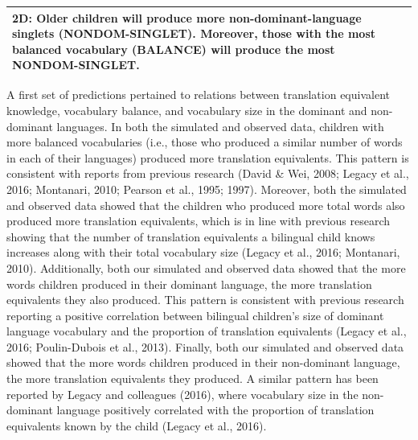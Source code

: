 \documentclass[
  english,
  ,man,floatsintext]{apa6}
\begin{document}
\begin{landscape}
\begin{table}
\begin{tabular}[t]{>{\raggedright\arraybackslash}p{200px}>{\raggedright\arraybackslash}p{250px}>{\centering\arraybackslash}p{150px}}
2D: Older children will produce more non-dominant-language singlets (NONDOM-SINGLET). Moreover, those with the most balanced vocabulary (BALANCE) will produce the most NONDOM-SINGLET. &  & \\
\bottomrule
\end{tabular}
\end{table}
\end{landscape}

A first set of predictions pertained to relations between translation equivalent knowledge, vocabulary balance, and vocabulary size in the dominant and non-dominant languages. In both the simulated and observed data, children with more balanced vocabularies (i.e., those who produced a similar number of words in each of their languages) produced more translation equivalents. This pattern is consistent with reports from previous research (David \& Wei, 2008; Legacy et al., 2016; Montanari, 2010; Pearson et al., 1995; 1997). Moreover, both the simulated and observed data showed that the children who produced more total words also produced more translation equivalents, which is in line with previous research showing that the number of translation equivalents a bilingual child knows increases along with their total vocabulary size (Legacy et al., 2016; Montanari, 2010). Additionally, both our simulated and observed data showed that the more words children produced in their dominant language, the more translation equivalents they also produced. This pattern is consistent with previous research reporting a positive correlation between bilingual children's size of dominant language vocabulary and the proportion of translation equivalents (Legacy et al., 2016; Poulin-Dubois et al., 2013). Finally, both our simulated and observed data showed that the more words children produced in their non-dominant language, the more translation equivalents they produced. A similar pattern has been reported by Legacy and colleagues (2016), where vocabulary size in the non-dominant language positively correlated with the proportion of translation equivalents known by the child (Legacy et al., 2016).
\end{document}
